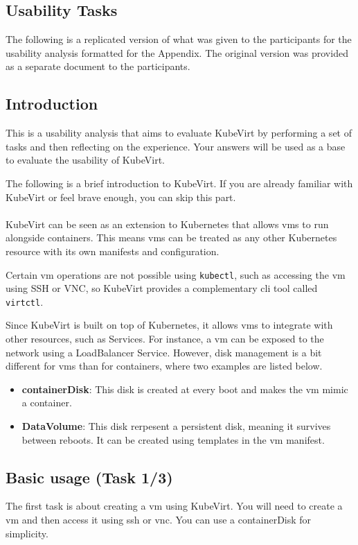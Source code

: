 \documentclass{kththesis}
\begin{document}
\begin{enumerate}
\newpage

\cleardoublepage
\chapter{Usability Tasks}
\label{appendix:usability-tasks}
The following is a replicated version of what was given to the participants for the usability analysis formatted for the Appendix. The original version was provided as a separate document to the participants.

\section*{Introduction}
This is a usability analysis that aims to evaluate KubeVirt by performing a set of tasks and then reflecting on the experience. Your answers will be used as a base to evaluate the usability of KubeVirt.

The following is a brief introduction to KubeVirt. If you are already familiar with KubeVirt or feel brave enough, you can skip this part.
\\~\\
KubeVirt can be seen as an extension to Kubernetes that allows \Glspl{vm} to run alongside containers. This means \Glspl{vm} can be treated as any other Kubernetes resource with its own manifests and configuration. 

Certain \Gls{vm} operations are not possible using \texttt{kubectl}, such as accessing the \Gls{vm} using SSH or VNC, so KubeVirt provides a complementary \Gls{cli} tool called \texttt{virtctl}.

Since KubeVirt is built on top of Kubernetes, it allows \Glspl{vm} to integrate with other resources, such as Services. For instance, a \Gls{vm} can be exposed to the network using a LoadBalancer Service. However, disk management is a bit different for \Glspl{vm} than for containers, where two examples are listed below. 
\begin{itemize}
    \item \textbf{containerDisk}: This disk is created at every boot and makes the \Gls{vm} mimic a container.
    \item \textbf{DataVolume}: This disk rerpesent a persistent disk, meaning it survives between reboots. It can be created using templates in the \Gls{vm} manifest.
\end{itemize}

\section*{Basic usage (Task 1/3)}
The first task is about creating a \Gls{vm} using KubeVirt. You will need to create a \Gls{vm} and then access it using \Gls{ssh} or \Gls{vnc}. You can use a containerDisk for simplicity.


\end{enumerate}
\end{document}
